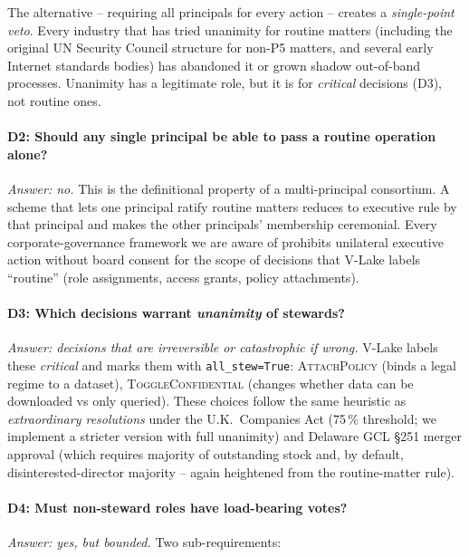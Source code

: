 \documentclass[10pt,twocolumn]{article}
\begin{document}
The alternative -- requiring all principals for every action --
creates a \emph{single-point veto}. Every industry that has tried
unanimity for routine matters (including the original UN Security
Council structure for non-P5 matters, and several early Internet
standards bodies) has abandoned it or grown shadow out-of-band
processes. Unanimity has a legitimate role, but it is for
\emph{critical} decisions (D3), not routine ones.

\paragraph{D2: Should any single principal be able to pass a
routine operation alone?}
\emph{Answer: no.} This is the definitional property of a
multi-principal consortium. A scheme that lets one principal
ratify routine matters reduces to executive rule by that principal
and makes the other principals' membership ceremonial. Every
corporate-governance framework we are aware of prohibits unilateral
executive action without board consent for the scope of decisions
that V-Lake labels ``routine'' (role assignments, access grants,
policy attachments).

\paragraph{D3: Which decisions warrant \emph{unanimity} of
stewards?}
\emph{Answer: decisions that are irreversible or catastrophic if
wrong.} V-Lake labels these \emph{critical} and marks them with
\texttt{all\_stew=True}: \textsc{AttachPolicy} (binds a legal
regime to a dataset), \textsc{ToggleConfidential} (changes whether
data can be downloaded vs only queried). These choices follow the
same heuristic as \emph{extraordinary resolutions} under the U.K.\
Companies Act (75\,\% threshold; we implement a stricter version
with full unanimity) and Delaware GCL \S251 merger approval (which
requires majority of outstanding stock and, by default,
disinterested-director majority -- again heightened from the
routine-matter rule).

\paragraph{D4: Must non-steward roles have load-bearing votes?}
\emph{Answer: yes, but bounded.} Two sub-requirements:
\end{document}
